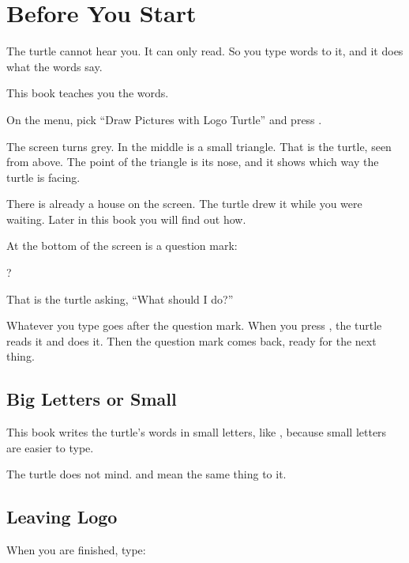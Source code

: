 \documentclass[12pt,oneside,paper=5.5in:8.5in,DIV=11,chapterprefix=false,headings=big]{scrbook}
\begin{document}
\mainmatter

\chaptericon{\faPowerOff}
\chapter{Before You Start}
\label{ch:start}


The turtle cannot hear you.
It can only read.
So you type words to it,
and it does what the words say.

This book teaches you the words.

On the menu, pick
``Draw Pictures with Logo Turtle''
and press .

The screen turns grey.
In the middle is a small triangle.
That is the turtle, seen from above.
The point of the triangle is its nose,
and it shows which way the turtle is facing.

There is already a house on the screen.
The turtle drew it while you were waiting.
Later in this book you will find out how.

At the bottom of the screen is a question mark:

\begin{code}
?
\end{code}

That is the turtle asking,
``What should I do?''

Whatever you type goes after the question mark.
When you press ,
the turtle reads it and does it.
Then the question mark comes back,
ready for the next thing.

\section{Big Letters or Small}

This book writes the turtle's words in small letters,
like ,
because small letters are easier to type.

The turtle does not mind.
 and  mean the same thing to it.

\section{Leaving Logo}

When you are finished, type:
\end{document}

